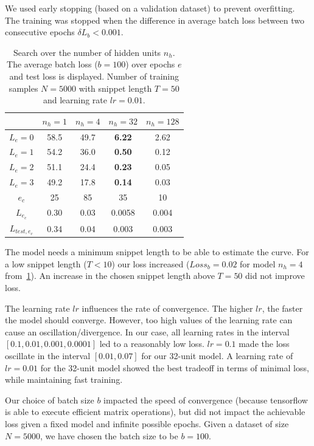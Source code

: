 We used early stopping (based on a validation dataset) to prevent overfitting.
The training was stopped when the difference in average batch loss between two consecutive epochs $\delta L_b < 0.001$.


\begin{table}[]
\centering
\begin{tabular}{ c| c| c| c| c}
& $n_h=1$ & $n_h=4$ &$n_h=32$ & $n_h=128$\\
\hline
$L_e=0$ & 58.5 & 49.7  & \textbf{6.22} & 2.62      \\
$L_e=1$ & 54.2 & 36.0  & \textbf{0.50} & 0.12      \\
$L_e=2$ & 51.1 & 24.4  & \textbf{0.23} & 0.05      \\
$L_e=3$ & 49.2 & 17.8  & \textbf{0.14} & 0.03      \\
\hline
$e_c$ 			& 25 	& 85 	& 35	& 10 		\\
$L_{e_c}$		&  0.30	& 0.03	& 0.0058& 0.004 	\\
$L_{test, e_c}$	& 0.34	& 0.04	&0.003	& 0.003 	\\     
\end{tabular}
\caption{Search over the number of hidden units $n_h$. The average batch loss ($b=100$) over epochs $e$ and test loss is displayed. Number of training samples $N = 5000$ with snippet length $T=50$ and learning rate $lr=0.01$.}
\label{tab:rnn_hidden}
\end{table}


The model needs a minimum snippet length to be able to estimate the curve.
For a low snippet length ($T<10$) our loss increased ($Loss_b=0.02$ for model $n_h=4$ from~\cref{tab:rnn_hidden}).
An increase in the chosen snippet length above $T=50$ did not improve loss.

The learning rate $lr$ influences the rate of convergence.
The higher $lr$, the faster the model should converge.
However, too high values of the learning rate can cause an oscillation/divergence.
In our case, all learning rates in the interval $[0.1, 0.01, 0.001, 0.0001]$ led to a reasonably low loss.
$lr=0.1$ made the loss oscillate in the interval $[0.01, 0.07]$ for our 32-unit model.
A learning rate of $lr=0.01$ for the 32-unit model showed the best tradeoff in terms of minimal loss, while maintaining fast training.

Our choice of batch size $b$ impacted the speed of convergence (because tensorflow is able to execute efficient matrix operations), but did not impact the achievable loss given a fixed model and infinite possible epochs.
Given a dataset of size $N=5000$, we have chosen the batch size to be $b=100$.

